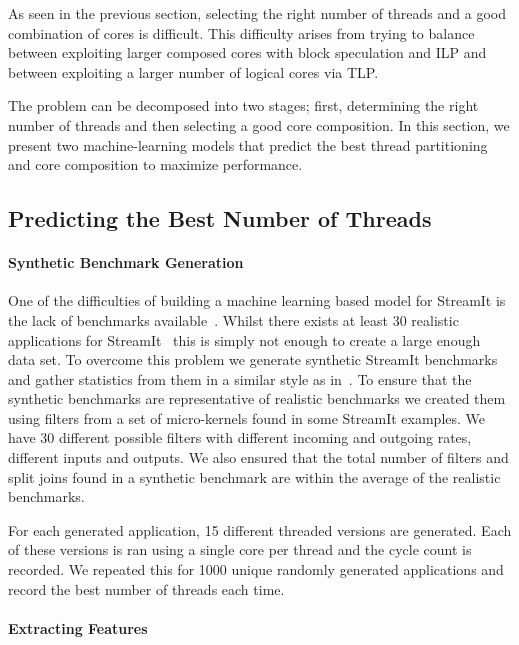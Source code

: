 As seen in the previous section, selecting the right number of threads and a good combination of cores is difficult.
This difficulty arises from trying to balance between exploiting larger composed cores with block speculation and ILP and between exploiting a larger number of logical cores via TLP.

The problem can be decomposed into two stages; first, determining the right number of threads and then selecting a good core composition.
In this section, we present two machine-learning models that predict the best thread partitioning and core composition to maximize performance.

\subsection{Predicting the Best Number of Threads}

\paragraph{Synthetic Benchmark Generation}

One of the difficulties of building a machine learning based model for StreamIt is the lack of benchmarks available~\cite{wang2013partitionstreamit}.
Whilst there exists at least 30 realistic applications for StreamIt~\cite{theis2010empericalcharstreamit} this is simply not enough to create a large enough data set.
To overcome this problem we generate synthetic StreamIt benchmarks and gather statistics from them in a similar style as in~\cite{wang2013partitionstreamit}.
To ensure that the synthetic benchmarks are representative of realistic benchmarks we created them using filters from a set of micro-kernels found in some StreamIt examples.
We have 30 different possible filters with different incoming and outgoing rates, different inputs and outputs.
We also ensured that the total number of filters and split joins found in a synthetic benchmark are within the average of the realistic benchmarks.

For each generated application, 15 different threaded versions are generated.
Each of these versions is ran using a single core per thread and the cycle count is recorded.
We repeated this for 1000 unique randomly generated applications and record the best number of threads each time.

\paragraph{Extracting Features}

